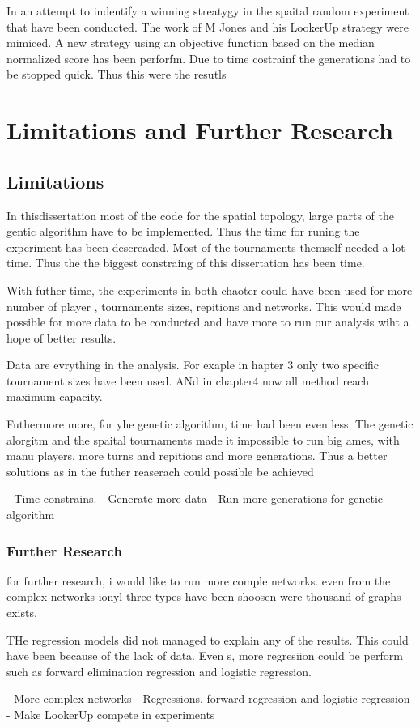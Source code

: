 In an attempt to indentify a winning streatygy in the spaital random experiment
that have been conducted. The work of M Jones and his LookerUp strategy were mimiced.
A new strategy using an objective function based on the median normalized score
has been perforfm. Due to time costrainf the generations had to be stopped
quick. Thus this were the resutls

\section{Limitations and Further Research}
\subsection{Limitations}

In thisdissertation most of the code for the spatial topology, large parts of the gentic algorithm
have to be implemented. Thus the time for runing the experiment has been descreaded.
Most of the tournaments themself needed a lot time. Thus the the biggest constraing
of this dissertation has been time.

With futher time, the experiments in both chaoter could have been used for
more number of player , tournaments sizes, repitions and networks. This would
made possible for more data to be conducted and have more to run our analysis
wiht a hope of better results.

Data are evrything in the analysis. For exaple in hapter 3 only two specific
tournament sizes have been used. ANd in chapter4 now all method reach maximum capacity.

Futhermore more, for yhe genetic algorithm, time had been even less. The genetic
alorgitm and the spaital tournaments made it impossible to run big ames, with
manu players. more turns and repitions and more generations. Thus a better solutions
as in the futher reaserach could possible be achieved

- Time constrains.
- Generate more data
- Run more generations for genetic algorithm
\subsubsection{Further Research}

for further research, i would like to run more comple networks. even from the complex
networks ionyl three types have been shoosen were thousand of graphs exists.

THe regression models did not managed to explain any of the results. This could have been
because of the lack of data. Even s, more regresiion could be perform such as
forward elimination regression and logistic regression.

- More complex networks
- Regressions, forward regression and logistic regression
- Make LookerUp compete in experiments
